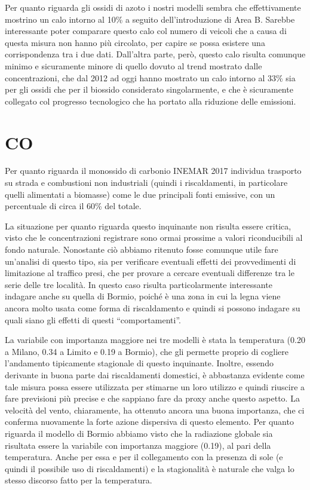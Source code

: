 Per quanto riguarda gli ossidi di azoto i nostri modelli sembra che effettivamente mostrino un calo intorno al 10\% a seguito dell'introduzione di Area B. Sarebbe interessante poter comparare questo calo col numero di veicoli che a causa di questa misura non hanno più circolato, per capire se possa esistere una corrispondenza tra i due dati. Dall'altra parte, però, questo calo risulta comunque minimo e sicuramente minore di quello dovuto al trend mostrato dalle concentrazioni, che dal 2012 ad oggi hanno mostrato un calo intorno al 33\% sia per gli ossidi che per il biossido considerato singolarmente, e che è sicuramente collegato col progresso tecnologico che ha portato alla riduzione delle emissioni.

\section{CO}
Per quanto riguarda il monossido di carbonio INEMAR 2017 individua trasporto su strada e combustioni non industriali (quindi i riscaldamenti, in particolare quelli alimentati a biomasse) come le due principali fonti emissive, con un percentuale di circa il 60\% del totale.

La situazione per quanto riguarda questo inquinante non risulta essere critica, visto che le concentrazioni registrare sono ormai prossime a valori riconducibili al fondo naturale. Nonostante ciò abbiamo ritenuto fosse comunque utile fare un'analisi di questo tipo, sia per verificare eventuali effetti dei provvedimenti di limitazione al traffico presi, che per provare a cercare eventuali differenze tra le serie delle tre località. In questo caso risulta particolarmente interessante indagare anche su quella di Bormio, poiché è una zona in cui la legna viene ancora molto usata come forma di riscaldamento e quindi si possono indagare su quali siano gli effetti di questi ``comportamenti''.

La variabile con importanza maggiore nei tre modelli è stata la temperatura (0.20 a Milano, 0.34 a Limito e 0.19 a Bormio), che gli permette proprio di cogliere l'andamento tipicamente stagionale di questo inquinante. Inoltre, essendo derivante in buona parte dai riscaldamenti domestici, è abbastanza evidente come tale misura possa essere utilizzata per stimarne un loro utilizzo e quindi riuscire a fare previsioni più precise e che sappiano fare da proxy anche questo aspetto.
La velocità del vento, chiaramente, ha ottenuto ancora una buona importanza, che ci conferma nuovamente la forte azione dispersiva di questo elemento.
Per quanto riguarda il modello di Bormio abbiamo visto che la radiazione globale sia risultata essere la variabile con importanza maggiore (0.19), al pari della temperatura. Anche per essa e per il collegamento con la presenza di sole (e quindi il possibile uso di riscaldamenti) e la stagionalità è naturale che valga lo stesso discorso fatto per la temperatura.

